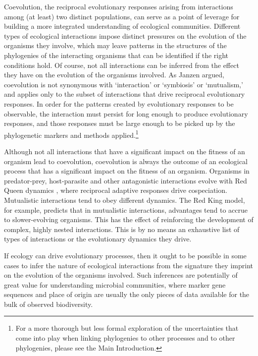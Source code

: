 Coevolution, the reciprocal evolutionary responses arising from interactions among (at least) two distinct populations, can serve as a point of leverage for building a more integrated understanding of ecological communities. Different types of ecological interactions impose distinct pressures on the evolution of the organisms they involve, which may leave patterns in the structures of the phylogenies of the interacting organisms that can be identified if the right conditions hold. \cite{gibson2015phylogenetic, bergstrom2003red, gokhale2012mutualism} Of course, not all interactions can be inferred from the effect they have on the evolution of the organisms involved. As Janzen argued, coevolution is not synonymous with `interaction' or `symbiosis' or `mutualism,' and applies only to the subset of interactions that drive reciprocal evolutionary responses. \cite{janzen1980coevolution} In order for the patterns created by evolutionary responses to be observable, the interaction must persist for long enough to produce evolutionary responses, and those responses must be large enough to be picked up by the phylogenetic markers and methods applied.\footnote{For a more thorough but less formal exploration of the uncertainties that come into play when linking phylogenies to other processes and to other phylogenies, please see the Main Introduction.}

Although not all interactions that have a significant impact on the fitness of an organism lead to coevolution, coevolution is always the outcome of an ecological process that has a significant impact on the fitness of an organism. Organisms in predator-prey, host-parasite and other antagonistic interactions evolve with Red Queen dynamics \cite{van1973new, gibson2015phylogenetic}, where reciprocal adaptive responses drive cospeciation. Mutualistic interactions tend to obey different dynamics. \cite{Hillesland2017} The Red King model, \cite{bergstrom2003red, gokhale2012mutualism} for example, predicts that in mutualistic interactions, advantages tend to accrue to slower-evolving organisms. This has the effect of reinforcing the development of complex, highly nested interactions. \cite{bastolla2009architecture, rezende2007non} This is by no means an exhaustive list of types of interactions or the evolutionary dynamics they drive. 

If ecology can drive evolutionary processes, then it ought to be possible in some cases to infer the nature of ecological interactions from the signature they imprint on the evolution of the organisms involved. Such inferences are potentially of great value for understanding microbial communities, where marker gene sequences and place of origin are usually the only pieces of data available for the bulk of observed biodiversity.

